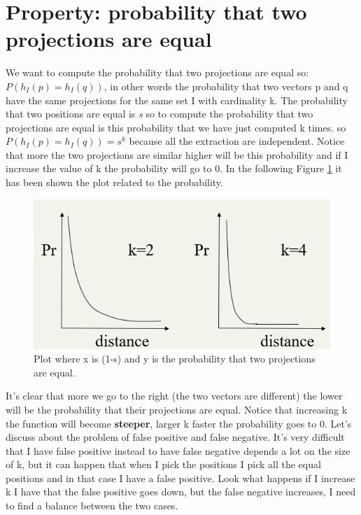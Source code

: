 \section{Property: probability that two projections are equal}
We want to compute the probability that two projections are equal so: $P (h_I(p)=h_I(q))$, in other words the probability that two vectors p and q have the same projections for the same set I with cardinality k.\newline
The probability that two positions are equal is \textit{s} so to compute the probability that two projections are equal is this probability that we have just computed k times. so $P (h_I(p)=h_I(q))=s^k$ because all the extraction are independent. Notice that more the two projections are similar higher will be this probability and if I increase the value of k the probability will go to 0. In the following Figure \ref{fig:probham} it has been shown the plot related to the probability.
\begin{figure}
    \centering
    \includegraphics[width=0.75\linewidth]{images/probabilityham.png}
    \caption{Plot where x is (1-s) and y is the probability that two projections are equal.}
    \label{fig:probham}
\end{figure}
It's clear that more we go to the right (the two vectors are different) the lower will be the probability that their projections are equal. Notice that increasing k the function will become \textbf{steeper}, larger k faster the probability goes to 0.
Let's discuss about the problem of false positive and false negative. It's very difficult that I have false positive instead to have false negative depends a lot on the size of k, but it can happen that when I pick the positions I pick all the equal positions and in that case I have a false positive.\newline
Look what happens if I increase k I have that the false positive goes down, but the false negative increases, I need to find a balance between the two cases.\newline
